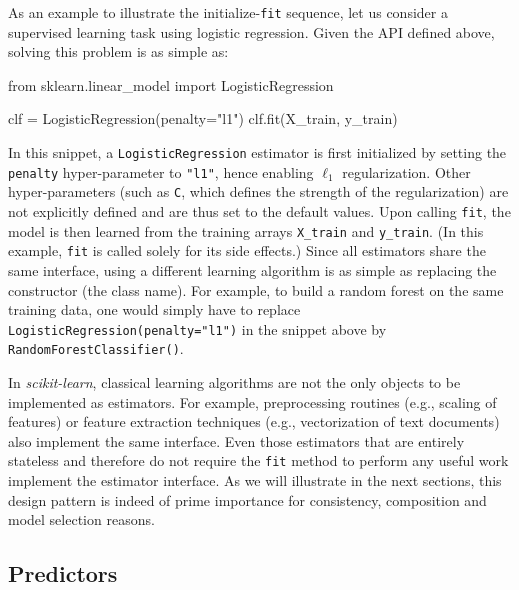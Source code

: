 \documentclass{llncs}
\newcommand{\sklearn}{\textit{scikit-learn}\xspace}
\begin{document}
As an example to illustrate the initialize-\texttt{fit} sequence,
let us consider a supervised learning task using logistic regression.
Given the API defined above, solving this problem is as simple as:
\begin{pythoncode}
from sklearn.linear_model import LogisticRegression

clf = LogisticRegression(penalty="l1")
clf.fit(X_train, y_train)
\end{pythoncode}
In this snippet, a \texttt{LogisticRegression} estimator is first initialized by
setting the \texttt{penalty} hyper-parameter to \texttt{"l1"}, hence enabling
$\ell_1$ regularization. Other hyper-parameters (such as \texttt{C}, which
defines the strength of the regularization) are not explicitly defined and are
thus set to the default values. Upon calling \texttt{fit}, the model is then
learned from the training arrays \texttt{X\_train} and \texttt{y\_train}.
(In this example, \texttt{fit} is called solely for its side effects.)
Since all estimators share the same interface, using a different learning algorithm is
as simple as replacing the constructor (the class name).
For example, to build a random forest on
the same training data, one would simply have to replace
\texttt{LogisticRegression(penalty="l1")} in the snippet above by \\
\texttt{RandomForestClassifier()}.

In \sklearn, classical learning algorithms are not the only objects to be
implemented as estimators. For example, preprocessing routines (e.g., scaling of
features) or feature extraction techniques (e.g., vectorization of text
documents) also implement the same interface. Even those estimators that are
entirely stateless and therefore do not require the \texttt{fit} method to
perform any useful work implement the estimator interface. As we will illustrate
in the next sections, this design pattern is indeed of prime importance for
consistency, composition and model selection reasons.

\subsection{Predictors}
\end{document}
